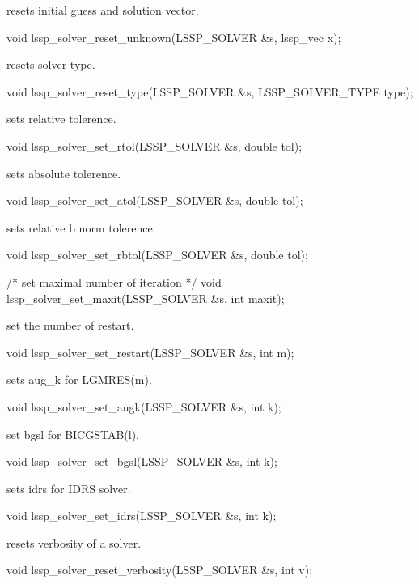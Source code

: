  resets initial guess and solution vector.
\begin{evb}
void lssp_solver_reset_unknown(LSSP_SOLVER &s, lssp_vec x);
\end{evb}

 resets solver type.
\begin{evb}
void lssp_solver_reset_type(LSSP_SOLVER &s, LSSP_SOLVER_TYPE type);
\end{evb}

 sets relative tolerence.
\begin{evb}
void lssp_solver_set_rtol(LSSP_SOLVER &s, double tol);
\end{evb}

 sets absolute tolerence.
\begin{evb}
void lssp_solver_set_atol(LSSP_SOLVER &s, double tol);
\end{evb}

 sets relative b norm tolerence.
\begin{evb}
void lssp_solver_set_rbtol(LSSP_SOLVER &s, double tol);
\end{evb}

\begin{evb}
/* set maximal number of iteration */
void lssp_solver_set_maxit(LSSP_SOLVER &s, int maxit);
\end{evb}

 set the number of restart.
\begin{evb}
void lssp_solver_set_restart(LSSP_SOLVER &s, int m);
\end{evb}

 sets aug\_k for LGMRES(m).
\begin{evb}
void lssp_solver_set_augk(LSSP_SOLVER &s, int k);
\end{evb}

 set bgsl for BICGSTAB(l).
\begin{evb}
void lssp_solver_set_bgsl(LSSP_SOLVER &s, int k);
\end{evb}

 sets idrs for IDRS solver.
\begin{evb}
void lssp_solver_set_idrs(LSSP_SOLVER &s, int k);
\end{evb}

 resets verbosity of a solver.
\begin{evb}
void lssp_solver_reset_verbosity(LSSP_SOLVER &s, int v);
\end{evb}

